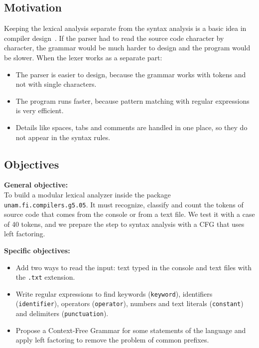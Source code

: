 \documentclass[letterpaper,12pt,oneside]{article}
\begin{document}
\subsection{Motivation}
Keeping the lexical analysis separate from the syntax analysis is a basic idea in compiler design~\cite{10.5555/576122}. If the parser had to read the source code character by character, the grammar would be much harder to design and the program would be slower. When the lexer works as a separate part:
\begin{itemize}
    \item The parser is easier to design, because the grammar works with tokens and not with single characters.
    \item The program runs faster, because pattern matching with regular expressions is very efficient.
    \item Details like spaces, tabs and comments are handled in one place, so they do not appear in the syntax rules.
\end{itemize}

\subsection{Objectives}
\textbf{General objective:} \\
To build a modular lexical analyzer inside the package \texttt{unam.fi.compilers.g5.05}. It must recognize, classify and count the tokens of source code that comes from the console or from a text file. We test it with a case of 40 tokens, and we prepare the step to syntax analysis with a CFG that uses left factoring.

\textbf{Specific objectives:}
\begin{itemize}
    \item Add two ways to read the input: text typed in the console and text files with the \texttt{.txt} extension.
    \item Write regular expressions to find keywords (\texttt{keyword}), identifiers (\texttt{identifier}), operators (\texttt{operator}), numbers and text literals (\texttt{constant}) and delimiters (\texttt{punctuation}).
    \item Propose a Context-Free Grammar for some statements of the language and apply left factoring to remove the problem of common prefixes.
\end{itemize}

\end{document}
